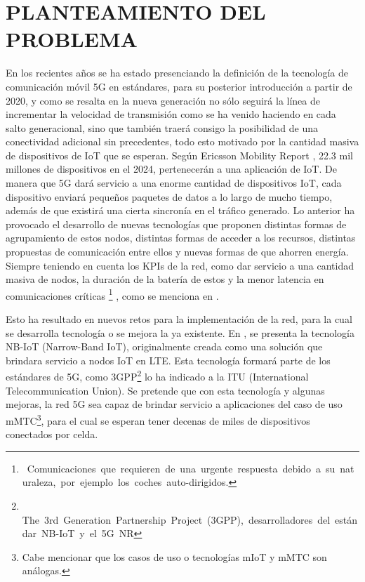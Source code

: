 
\section{PLANTEAMIENTO DEL PROBLEMA}

En los recientes años se ha estado presenciando la definición de la tecnología de comunicación móvil 5G en estándares, para su posterior introducción a partir de 2020, y como se resalta en \parencite{Fettweis2016} la nueva generación no sólo seguirá la línea de incrementar la velocidad de transmisión como se ha venido haciendo en cada salto generacional, sino que también traerá consigo la posibilidad de una conectividad adicional sin precedentes, todo esto motivado por la cantidad masiva de dispositivos de IoT que se esperan. Según Ericsson Mobility Report \parencite{Ericsson2019}, 22.3 mil millones de dispositivos en el 2024, pertenecerán a una aplicación de IoT. De manera que 5G dará servicio a una enorme cantidad de dispositivos IoT, cada dispositivo enviará pequeños paquetes de datos a lo largo de mucho tiempo, además de que existirá una cierta sincronía en el tráfico generado. Lo anterior ha provocado el desarrollo de nuevas tecnologías que proponen distintas formas de agrupamiento de estos nodos, distintas formas de acceder a los recursos, distintas propuestas de comunicación entre ellos y nuevas formas de que ahorren energía. Siempre teniendo en cuenta los KPIs de la red, como dar servicio a una cantidad masiva de nodos, la duración de la batería de estos y la menor latencia en comunicaciones críticas \footnote{\ Comunicaciones\ que\ requieren\ de\ una\ urgente\ respuesta\ debido\ a\ su\ naturaleza,\ por\ ejemplo\ los\ coches\ auto-dirigidos.} , como se menciona en \parencite{NGMN}.\newline

Esto ha resultado en nuevos retos para la implementación de la red, para la cual se desarrolla tecnología o se mejora la ya existente. En \parencite{GSMAssociation2019}, se presenta la tecnología NB-IoT (Narrow-Band IoT), originalmente creada como una solución que brindara servicio a nodos IoT en LTE. Esta tecnología formará parte de los estándares de 5G, como 3GPP\footnote{\ $  $The\ 3rd\ Generation\ Partnership\ Project\ (3GPP),\ desarrolladores\ del\ est\textrm{\'{a}}ndar\ NB-IoT\ y\ el\ 5G\ NR}
lo ha indicado a la ITU (International Telecommunication Union). Se pretende que con esta tecnología y algunas mejoras, la red 5G sea capaz de brindar servicio a aplicaciones del caso de uso mMTC\footnote{Cabe mencionar que los casos de uso o tecnologías mIoT y mMTC son análogas.}, para el cual se esperan tener decenas de miles de dispositivos conectados por celda. \newline

